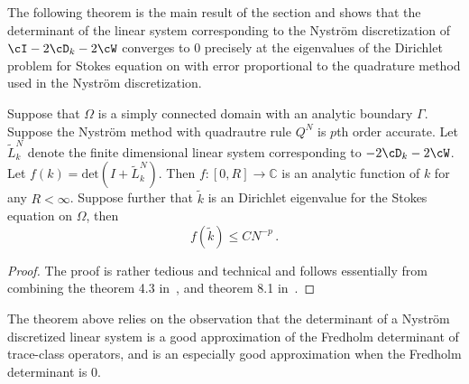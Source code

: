 


The following theorem is the main result of the section
and shows that the determinant of the
linear system corresponding to the Nystr\"{o}m 
discretization of $\cI - 2\cD_{k} - 2\cW$ 
converges to $0$ precisely at the eigenvalues of the Dirichlet
problem for Stokes equation on
with error proportional to the quadrature 
method used in the Nystr\"{o}m discretization.


\begin{thrm}
\label{thm:mainconvfreddet}
Suppose that $\Omega$ is a simply connected domain with an analytic boundary 
$\Gamma$. 
Suppose the Nystr\"{o}m method with quadrautre rule $Q^{N}$ 
is $p$th order accurate. 
Let $\tilde{L}^{N}_{k}$ denote the finite dimensional linear system corresponding
to $-2\cD_{k} -2\cW$.
Let $f(k) = \text{det}(I + \tilde{L}^{N}_{k})$. 
Then $f:[0,R] \to \mathbb{C}$  is an analytic function of $k$ 
for any $R<\infty$. 
Suppose further that $\tilde{k}$ is an Dirichlet eigenvalue for the Stokes 
equation on $\Omega$, then
\begin{equation}
f(\tilde{k}) \leq C N^{-p} \, . 
\end{equation}
\end{thrm}
\begin{proof}
The proof is rather tedious and technical and
follows essentially from combining the theorem 4.3 in~\cite{zhao2015robust}, 
and theorem 8.1 in~\cite{bornemann2010numerical}.
\end{proof}
The theorem above relies on the observation that
the determinant of a Nystr\"{o}m discretized linear system
is a good approximation of the Fredholm determinant of trace-class
operators, and is an especially good approximation
when the Fredholm determinant is $0$.



